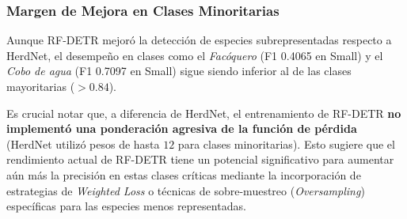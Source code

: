 \subsubsection{Margen de Mejora en Clases Minoritarias}
Aunque RF-DETR mejoró la detección de especies subrepresentadas respecto a HerdNet, el desempeño en clases como el \textit{Facóquero} (F1 0.4065 en Small) y el \textit{Cobo de agua} (F1 0.7097 en Small) sigue siendo inferior al de las clases mayoritarias ($>0.84$).

Es crucial notar que, a diferencia de HerdNet, el entrenamiento de RF-DETR \textbf{no implementó una ponderación agresiva de la función de pérdida} (HerdNet utilizó pesos de hasta $12$ para clases minoritarias). Esto sugiere que el rendimiento actual de RF-DETR tiene un potencial significativo para aumentar aún más la precisión en estas clases críticas mediante la incorporación de estrategias de \textit{Weighted Loss} o técnicas de sobre-muestreo (\textit{Oversampling}) específicas para las especies menos representadas.
